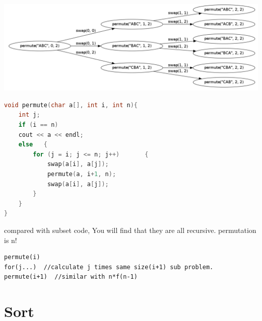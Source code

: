 \documentclass[a4paper,11pt,twoside]{book}
\begin{document}
\begin{center}
	\includegraphics[scale=0.25]{pics/permutation.png}
\end{center}


\begin{lstlisting}[frame=single, language=c++]
void permute(char a[], int i, int n){
	int j;
	if (i == n)
	cout << a << endl;
	else   {
		for (j = i; j <= n; j++)       {
			swap(a[i], a[j]);          
			permute(a, i+1, n);
			swap(a[i], a[j]);
		}
	}
} 		
\end{lstlisting}

	\par compared with subset code, You will find that they are all recursive. permutation is n!
\begin{lstlisting}
permute(i)
for(j...)  //calculate j times same size(i+1) sub problem.
permute(i+1)  //similar with n*f(n-1)		
\end{lstlisting}


\section{Sort}
\end{document}
